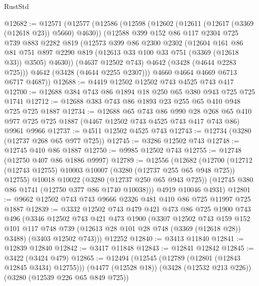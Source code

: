 \begin{lexlean}{RustStd}
\begin{coremodule}
@12682 := @12571
    (@12577
      (@12586
        (@12598
          (@12602 (@12611 (@12617 (@3369 (@12618 @23)) @5660) @4630))
          (@12588
            @399
            @152
            @86
            @117
            @2304
            @725
            @739
            @883
            @2282
            @819
            (@12573
              @399
              @86
              @2300
              @2302
              (@12604
                @161
                @86
                @81
                @751
                @897
                @2290
                @819
                (@12613 @33 @100 @33 @751 (@3369 (@12618 @33)) @3505)
                @4630))
            (@4637 @12502 @743)
            @4642
            (@3428 (@4644 @2283 @725)))
          @4642
          (@3428 (@4644 @2255 @2307)))
        @4660
        @4664
        @4669
        @6713
        @6717
        @4687))
@12688 := @4419 @12502 @12502 @743 @4525 @743 @417
@12700 := @12688 @384 @743 @86 @1894 @18 @250 @65 @380 @943 @725 @725 @1741
@12712 := @12688 @383 @743 @86 @1893 @23 @255 @65 @410 @948 @725 @725 @1887
@12734 := @12688
    @65
    @743
    @86
    @990
    @28
    @268
    @65
    @410
    @977
    @725
    @725
    @1887
    (@4467 @12502 @743 @4525 @743 @417 @743 @86)
    @9961
    @9966
@12737 := @4511 @12502 @4525 @743
@12743 := @12734 (@3280 (@12737 @268 @65 @977 @725))
@12745 := @3286 @12502 @743
@12748 := @12745 @410 @86 @1887
@12750 := @9985 @12502 @743
@12755 := @12748 (@12750 @407 @86 @1886 @9997)
@12789 := @12556
    (@12682
      (@12700
        (@12712 (@12743 @12755) @10003 @10007 (@3280 (@12737 @255 @65 @948 @725)) @12755)
        @10018
        @10022
        (@3280 (@12737 @250 @65 @943 @725))
        (@12745 @380 @86 @1741 (@12750 @377 @86 @1740 @10038)))
      @4919
      @10046
      @4931)
@12801 := @9662 @12502 @743 @743 @9666 @2326 @481 @410 @86 @725 @11997 @725 @1887
@12839 := @3332
    @12502
    @743
    @479
    @421
    @473
    @86
    @725
    @1900
    @743
    @496
    (@3346
      @12502
      @743
      @421
      @473
      @1900
      (@3307
        @12502
        @743
        @159
        @152
        @101
        @117
        @748
        @739
        (@12613 @28 @101 @28 @748 (@3369 (@12618 @28)) @3488)
        (@3403 @12502 @743)))
    @12252
@12840 := @3413 @11840
@12841 := @12839 @12840
@12842 := @3417 @11848
@12843 := @12841 @12842
@12845 := @3422 (@3424 @479)
@12865 := @12494
    (@12545 (@12789 (@12801 (@12843 @12845 @3434) @12755)))
    (@4477 (@12528 @18))
    (@3428 (@12532 @213 @226))
    (@3280 (@12539 @226 @65 @849 @725))

\end{coremodule}
\end{lexlean}
